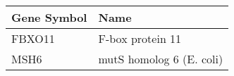 \begin{tabular}{ll}
\toprule
Gene Symbol &                     Name \\
\midrule
     FBXO11 &         F-box protein 11 \\
       MSH6 & mutS homolog 6 (E. coli) \\
\bottomrule
\end{tabular}
